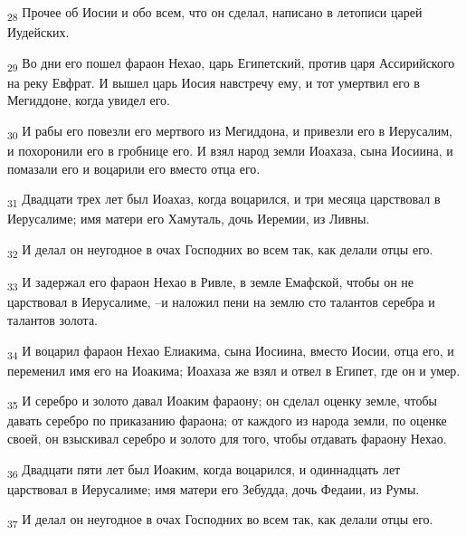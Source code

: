 \begin{tcolorbox}
\textsubscript{28} Прочее об Иосии и обо всем, что он сделал, написано в летописи царей Иудейских.
\end{tcolorbox}
\begin{tcolorbox}
\textsubscript{29} Во дни его пошел фараон Нехао, царь Египетский, против царя Ассирийского на реку Евфрат. И вышел царь Иосия навстречу ему, и тот умертвил его в Мегиддоне, когда увидел его.
\end{tcolorbox}
\begin{tcolorbox}
\textsubscript{30} И рабы его повезли его мертвого из Мегиддона, и привезли его в Иерусалим, и похоронили его в гробнице его. И взял народ земли Иоахаза, сына Иосиина, и помазали его и воцарили его вместо отца его.
\end{tcolorbox}
\begin{tcolorbox}
\textsubscript{31} Двадцати трех лет был Иоахаз, когда воцарился, и три месяца царствовал в Иерусалиме; имя матери его Хамуталь, дочь Иеремии, из Ливны.
\end{tcolorbox}
\begin{tcolorbox}
\textsubscript{32} И делал он неугодное в очах Господних во всем так, как делали отцы его.
\end{tcolorbox}
\begin{tcolorbox}
\textsubscript{33} И задержал его фараон Нехао в Ривле, в земле Емафской, чтобы он не царствовал в Иерусалиме, --и наложил пени на землю сто талантов серебра и талантов золота.
\end{tcolorbox}
\begin{tcolorbox}
\textsubscript{34} И воцарил фараон Нехао Елиакима, сына Иосиина, вместо Иосии, отца его, и переменил имя его на Иоакима; Иоахаза же взял и отвел в Египет, где он и умер.
\end{tcolorbox}
\begin{tcolorbox}
\textsubscript{35} И серебро и золото давал Иоаким фараону; он сделал оценку земле, чтобы давать серебро по приказанию фараона; от каждого из народа земли, по оценке своей, он взыскивал серебро и золото для того, чтобы отдавать фараону Нехао.
\end{tcolorbox}
\begin{tcolorbox}
\textsubscript{36} Двадцати пяти лет был Иоаким, когда воцарился, и одиннадцать лет царствовал в Иерусалиме; имя матери его Зебудда, дочь Федаии, из Румы.
\end{tcolorbox}
\begin{tcolorbox}
\textsubscript{37} И делал он неугодное в очах Господних во всем так, как делали отцы его.
\end{tcolorbox}
